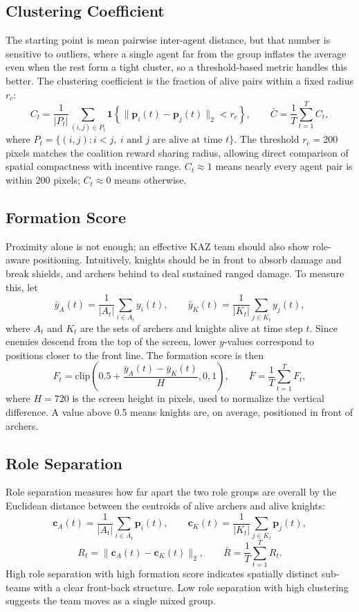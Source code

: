 \subsection{Clustering Coefficient}
The starting point is mean pairwise inter-agent distance, but that number is sensitive to outliers, where a single agent far from the group inflates the average even when the rest form a tight cluster, so a threshold-based metric handles this better. The clustering coefficient is the fraction of alive pairs within a fixed radius $r_c$:
\[
C_t = \frac{1}{|P_t|}\sum_{(i,j)\in P_t}
\mathbf{1}\left\{\|\mathbf{p}_i(t)-\mathbf{p}_j(t)\|_2 < r_c\right\},
\qquad
\bar C = \frac{1}{T}\sum_{t=1}^{T} C_t,
\]
where $P_t=\{(i,j): i<j,\ i \text{ and } j \text{ are alive at time } t\}$. The threshold $r_c = 200$ pixels matches the coalition reward sharing radius, allowing direct comparison of spatial compactness with incentive range. $C_t \approx 1$ means nearly every agent pair is within $200$ pixels; $C_t \approx 0$ means otherwise.

\subsection{Formation Score}

Proximity alone is not enough; an effective KAZ team should also show role-aware positioning. Intuitively, knights should be in front to absorb damage and break shields, and archers behind to deal sustained ranged damage. To measure this, let
\[
\bar y_A(t)=\frac{1}{|A_t|}\sum_{i\in A_t} y_i(t), \qquad
\bar y_K(t)=\frac{1}{|K_t|}\sum_{j\in K_t} y_j(t),
\]
where $A_t$ and $K_t$ are the sets of archers and knights alive at time step $t$. Since enemies descend from the top of the screen, lower $y$-values correspond to positions closer to the front line. The formation score is then
\[
F_t = \mathrm{clip}\!\left(0.5 + \frac{\bar y_A(t)-\bar y_K(t)}{H}, 0, 1\right),
\qquad
\bar F = \frac{1}{T}\sum_{t=1}^{T} F_t,
\]
where $H=720$ is the screen height in pixels, used to normalize the vertical difference. A value above 0.5 means knights are, on average, positioned in front of archers.

\subsection{Role Separation}
Role separation measures how far apart the two role groups are overall by the Euclidean distance between the centroids of alive archers and alive knights:
\[
\mathbf{c}_A(t)=\frac{1}{|A_t|}\sum_{i\in A_t}\mathbf{p}_i(t), \qquad
\mathbf{c}_K(t)=\frac{1}{|K_t|}\sum_{j\in K_t}\mathbf{p}_j(t),
\]
\[
R_t = \|\mathbf{c}_A(t)-\mathbf{c}_K(t)\|_2,
\qquad
\bar R = \frac{1}{T}\sum_{t=1}^{T} R_t.
\]
High role separation with high formation score indicates spatially distinct sub-teams with a clear front-back structure. Low role separation with high clustering suggests the team moves as a single mixed group.

